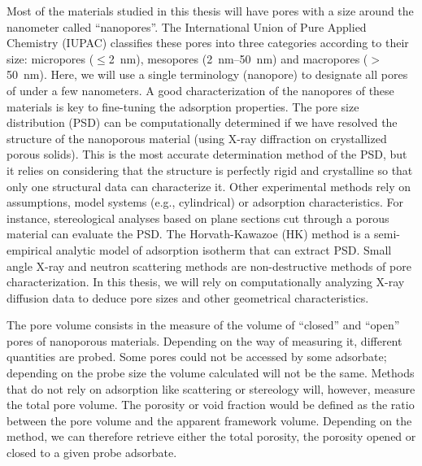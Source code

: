 \documentclass[main.tex]{subfiles}
\begin{document}
Most of the materials studied in this thesis will have pores with a size around the nanometer called ``nanopores''. The International Union of Pure Applied Chemistry (IUPAC) classifies these pores into three categories according to their size: micropores ($\leq$\SI{2}{\nano\meter}), mesopores (\SI{2}{\nano\meter}--\SI{50}{\nano\meter}) and macropores ($>$\SI{50}{\nano\meter}).\cite{Sing_1985} Here,
we will use a single terminology (nanopore) to designate all pores of under a few nanometers. A good characterization of the nanopores of these materials is key to fine-tuning the adsorption properties.\cite{Yan_2020} The pore size distribution (PSD) can be computationally determined if we have resolved the structure of the nanoporous material (using X-ray diffraction on crystallized porous solids). This is the most accurate determination method of the PSD, but it relies on considering that the structure is perfectly rigid and crystalline so that only one structural data can characterize it. Other experimental methods rely on assumptions, model systems (e.g., cylindrical) or adsorption characteristics. For instance, stereological analyses based on plane sections cut through a porous material can evaluate the PSD.\cite{Haynes_1973} The Horvath-Kawazoe (HK) method is a semi-empirical analytic model of adsorption isotherm that can extract PSD. Small angle X-ray and neutron scattering methods are non-destructive methods of pore characterization.\cite{Radlinski_2004} In this thesis, we will rely on computationally analyzing X-ray diffusion data to deduce pore sizes and other geometrical characteristics. 

The pore volume consists in the measure of the volume of ``closed'' and ``open'' pores of nanoporous materials. Depending on the way of measuring it, different quantities are probed. Some pores could not be accessed by some adsorbate; depending on the probe size the volume calculated will not be the same. Methods that do not rely on adsorption like scattering or stereology will, however, measure the total pore volume. The porosity or void fraction would be defined as the ratio between the pore volume and the apparent framework volume. Depending on the method, we can therefore retrieve either the total porosity, the porosity opened or closed to a given probe adsorbate. 
\end{document}
